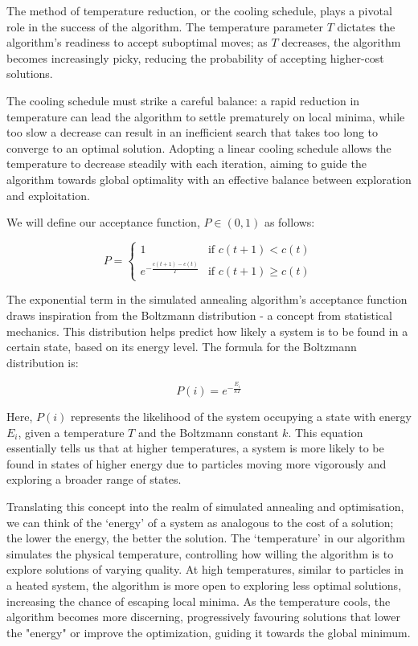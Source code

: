 \documentclass[12pt]{article}
\begin{document}
The method of temperature reduction, or the cooling schedule, plays a pivotal role in the success of the algorithm. The temperature parameter \(T\)  dictates the algorithm's readiness to accept suboptimal moves; as \(T\) decreases, the algorithm becomes increasingly picky, reducing the probability of accepting higher-cost solutions. 

The cooling schedule must strike a careful balance: a rapid reduction in temperature can lead the algorithm to settle prematurely on local minima, while too slow a decrease can result in an inefficient search that takes too long to converge to an optimal solution. Adopting a linear cooling schedule allows the temperature to decrease steadily with each iteration, aiming to guide the algorithm towards global optimality with an effective balance between exploration and exploitation.

We will define our acceptance function, $P \in (0,1)$ as follows:

\begin{equation}
    P = \begin{cases}
        1 & \text{if } c(t+1) < c(t) \\
        e^{-\frac{c(t+1) - c(t)}{T}} & \text{if } c(t+1) \geq c(t)
    \end{cases}
\end{equation}

The exponential term in the simulated annealing algorithm's acceptance function draws inspiration from the Boltzmann distribution - a concept from statistical mechanics. This distribution helps predict how likely a system is to be found in a certain state, based on its energy level. The formula for the Boltzmann distribution is:

\begin{equation}
    P(i) = e^{-\frac{E_i}{kT}}
\end{equation}

Here, \(P(i)\) represents the likelihood of the system occupying a state with energy \(E_i\), given a temperature \(T\) and the Boltzmann constant \(k\). This equation essentially tells us that at higher temperatures, a system is more likely to be found in states of higher energy due to particles moving more vigorously and exploring a broader range of states.

Translating this concept into the realm of simulated annealing and optimisation, we can think of the `energy' of a system as analogous to the cost of a solution; the lower the energy, the better the solution. The `temperature' in our algorithm simulates the physical temperature, controlling how willing the algorithm is to explore solutions of varying quality. At high temperatures, similar to particles in a heated system, the algorithm is more open to exploring less optimal solutions, increasing the chance of escaping local minima. As the temperature cools, the algorithm becomes more discerning, progressively favouring solutions that lower the "energy" or improve the optimization, guiding it towards the global minimum.
\end{document}
